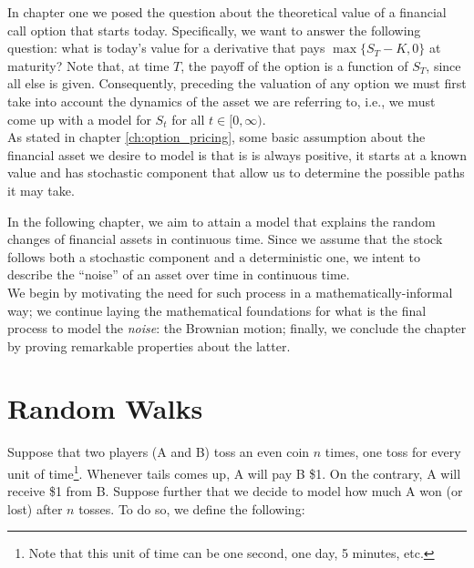 \documentclass[../TGMAFFIRO]{subfiles}
\begin{document}
	



In chapter one we posed the question about the theoretical value of a financial call option that starts today. Specifically, we want to answer the following question: what is today's value for a derivative that pays $\max\{S_T-K, 0\}$ at maturity? Note that, at time $T$, the payoff of the option is a function of $S_T$, since all else is given. Consequently, preceding the valuation of any option we must first take into account the dynamics of the asset we are referring to, i.e., we must come up with a model for $S_t$ for all $t \in [0,\infty)$.\\

As stated in chapter \ref{ch:option_pricing}, some basic assumption about the financial asset we desire to model is that is is always positive, it starts at a known value and has stochastic component that allow us to determine the possible paths it may take.

In the following chapter, we aim to attain a model that explains the random changes of financial assets in continuous time. Since we assume that the stock follows both a stochastic component and a deterministic one, we intent to describe the ``noise'' of an asset over time in continuous time.\\

We begin by motivating the need for such process in a mathematically-informal way; we continue laying the mathematical foundations for what is the final process to model the \textit{noise}: the Brownian motion; finally, we conclude the chapter by proving remarkable properties about the latter.

\section{Random Walks}
Suppose that two players (A and B) toss an even coin $n$ times, one toss for every unit of time\footnote{Note that this unit of time can be one second, one day, 5 minutes, etc.}. Whenever tails comes up, A will pay B \$1. On the contrary, A will receive \$1 from B. Suppose further that we decide to model how much A won (or lost) after $n$ tosses. To do so, we define the following:
\end{document}
